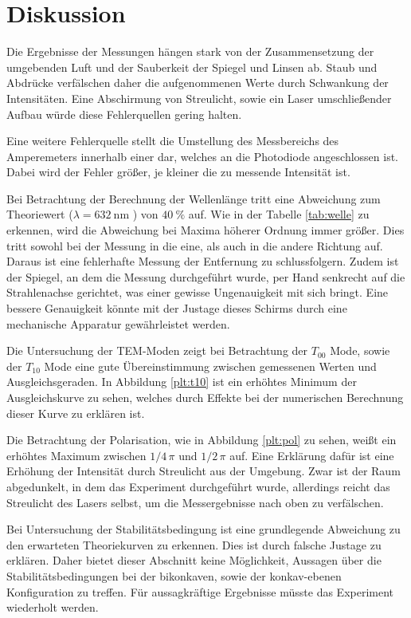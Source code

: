 \newpage
\section{Diskussion}
Die Ergebnisse der Messungen hängen stark von der Zusammensetzung der umgebenden
Luft und der Sauberkeit der Spiegel und Linsen ab. Staub und Abdrücke verfälschen
daher die aufgenommenen Werte durch Schwankung der Intensitäten. Eine
Abschirmung von Streulicht, sowie ein Laser umschließender Aufbau würde diese
Fehlerquellen gering halten.

Eine weitere Fehlerquelle stellt die Umstellung des Messbereichs des
Amperemeters innerhalb einer dar, welches an die Photodiode angeschlossen ist.
Dabei wird der Fehler größer, je kleiner die zu messende Intensität ist.

Bei Betrachtung der Berechnung der Wellenlänge tritt eine Abweichung zum
Theoriewert ($\lambda = \SI{632}{\nano\meter}$ \cite{anleitung}) von
$\SI{40}{\percent}$ auf. Wie in der Tabelle \ref{tab:welle} zu erkennen,
wird die Abweichung bei Maxima höherer Ordnung immer größer. Dies tritt sowohl
bei der Messung in die eine, als auch in die andere Richtung auf. Daraus ist eine
fehlerhafte Messung der Entfernung zu schlussfolgern. Zudem ist der Spiegel, an
dem die Messung durchgeführt wurde, per Hand senkrecht auf die Strahlenachse
gerichtet, was einer gewisse Ungenauigkeit mit sich bringt. Eine bessere Genauigkeit könnte
mit der Justage dieses Schirms durch eine mechanische Apparatur gewährleistet
werden.

Die Untersuchung der TEM-Moden zeigt bei Betrachtung der $T_{00}$ Mode, sowie
der $T_{10}$ Mode eine gute Übereinstimmung zwischen gemessenen Werten und
Ausgleichsgeraden. In Abbildung \ref{plt:t10} ist ein erhöhtes Minimum der
Ausgleichskurve zu sehen, welches durch Effekte bei der numerischen Berechnung
dieser Kurve zu erklären ist.

Die Betrachtung der Polarisation, wie in Abbildung \ref{plt:pol} zu sehen, weißt
ein erhöhtes Maximum zwischen $1/4\,\pi$ und $1/2\,\pi$ auf. Eine
Erklärung dafür ist eine Erhöhung der Intensität durch Streulicht aus der
Umgebung. Zwar ist der Raum abgedunkelt, in dem das Experiment durchgeführt wurde,
allerdings reicht das Streulicht des Lasers selbst, um die
Messergebnisse nach oben zu verfälschen.

Bei Untersuchung der Stabilitätsbedingung ist eine grundlegende
Abweichung zu den erwarteten Theoriekurven zu erkennen.
Dies ist durch falsche Justage zu erklären.
Daher bietet dieser Abschnitt keine Möglichkeit, Aussagen über die
Stabilitätsbedingungen bei der bikonkaven, sowie der konkav-ebenen Konfiguration
zu treffen. Für aussagkräftige Ergebnisse müsste das Experiment
wiederholt werden.
